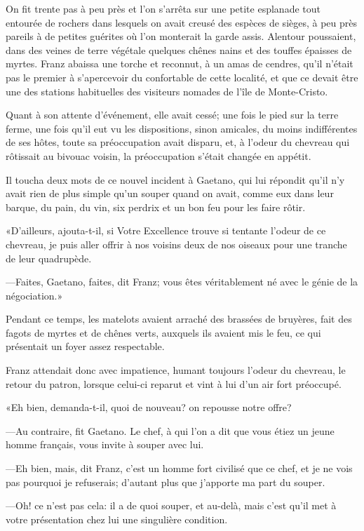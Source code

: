 On fit trente pas à peu près et l'on s'arrêta sur une petite esplanade tout entourée de rochers dans lesquels on avait creusé des espèces de sièges, à peu près pareils à de petites guérites où l'on monterait la garde assis. Alentour poussaient, dans des veines de terre végétale quelques chênes nains et des touffes épaisses de myrtes. Franz abaissa une torche et reconnut, à un amas de cendres, qu'il n'était pas le premier à s'apercevoir du confortable de cette localité, et que ce devait être une des stations habituelles des visiteurs nomades de l'île de Monte-Cristo.

Quant à son attente d'événement, elle avait cessé; une fois le pied sur la terre ferme, une fois qu'il eut vu les dispositions, sinon amicales, du moins indifférentes de ses hôtes, toute sa préoccupation avait disparu, et, à l'odeur du chevreau qui rôtissait au bivouac voisin, la préoccupation s'était changée en appétit.

Il toucha deux mots de ce nouvel incident à Gaetano, qui lui répondit qu'il n'y avait rien de plus simple qu'un souper quand on avait, comme eux dans leur barque, du pain, du vin, six perdrix et un bon feu pour les faire rôtir.

«D'ailleurs, ajouta-t-il, si Votre Excellence trouve si tentante l'odeur de ce chevreau, je puis aller offrir à nos voisins deux de nos oiseaux pour une tranche de leur quadrupède.

—Faites, Gaetano, faites, dit Franz; vous êtes véritablement né avec le génie de la négociation.»

Pendant ce temps, les matelots avaient arraché des brassées de bruyères, fait des fagots de myrtes et de chênes verts, auxquels ils avaient mis le feu, ce qui présentait un foyer assez respectable.

Franz attendait donc avec impatience, humant toujours l'odeur du chevreau, le retour du patron, lorsque celui-ci reparut et vint à lui d'un air fort préoccupé.

«Eh bien, demanda-t-il, quoi de nouveau? on repousse notre offre?

—Au contraire, fit Gaetano. Le chef, à qui l'on a dit que vous étiez un jeune homme français, vous invite à souper avec lui.

—Eh bien, mais, dit Franz, c'est un homme fort civilisé que ce chef, et je ne vois pas pourquoi je refuserais; d'autant plus que j'apporte ma part du souper.

—Oh! ce n'est pas cela: il a de quoi souper, et au-delà, mais c'est qu'il met à votre présentation chez lui une singulière condition.

